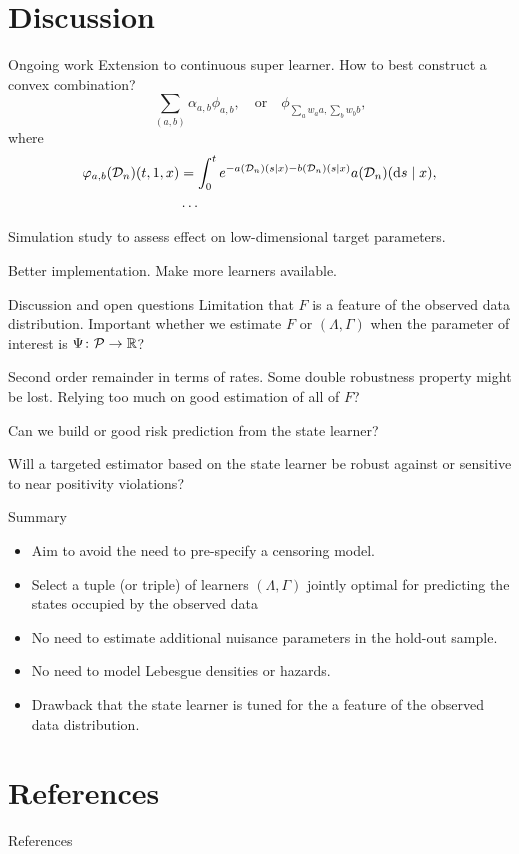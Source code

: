 \documentclass[smaller]{beamer}\usepackage{listings}
\begin{document}
\section{Discussion}
\label{sec:org10c1928}
\begin{frame}[label={sec:org8f9f393}]{Ongoing work}
Extension to continuous super learner. How to best construct a convex
combination?
\begin{equation*}
  \sum_{(a, b)} \alpha_{a,b} \phi_{a, b},
  \quad \text{or} \quad 
  \phi_{\sum_a w_a a, \sum_b w_b b}, 
\end{equation*}
where
\begin{align*}
  \varphi_{a, b}(\mathcal{D}_n)(t,1,x) &= \int_0^t e^{-a(\mathcal{D}_n)(s \mid
    x) -
    b(\mathcal{D}_n)(s \mid x) }  a(\mathcal{D}_n)(\mathop{}\!\mathrm{d} s \mid x),
  \\
  & \dots 
\end{align*}


\vfill

Simulation study to assess effect on low-dimensional target parameters.

\vfill

Better implementation. Make more learners available.
\end{frame}

\begin{frame}[label={sec:orgdb37af7}]{Discussion and open questions}
Limitation that \(F\) is a feature of the observed data distribution.
Important whether we estimate \(F\) or \((\Lambda, \Gamma)\) when the
parameter of interest is \(\Psi \colon \mathcal{P} \rightarrow \mathbb{R}\)?

\vfill

Second order remainder in terms of rates. Some double robustness property might
be lost. Relying too much on good estimation of all of \(F\)?

\vfill

Can we build or good risk prediction from the state learner?

\vfill

Will a targeted estimator based on the state learner be robust against or
sensitive to near positivity violations?
\end{frame}

\begin{frame}[label={sec:orgdbdd600}]{Summary}
\begin{itemize}
\item Aim to avoid the need to pre-specify a censoring model.
\item Select a tuple (or triple) of learners \((\Lambda, \Gamma)\) jointly optimal
for predicting the states occupied by the observed data
\item No need to estimate additional nuisance parameters in the hold-out sample.
\item No need to model Lebesgue densities or hazards.
\item Drawback that the state learner is tuned for the a feature of the observed
data distribution.
\end{itemize}
\end{frame}

\section*{References}
\label{sec:orgb1961be}
\begin{frame}[label={sec:orged3ce61}]{References}
\tiny 
\end{frame}
\end{document}
